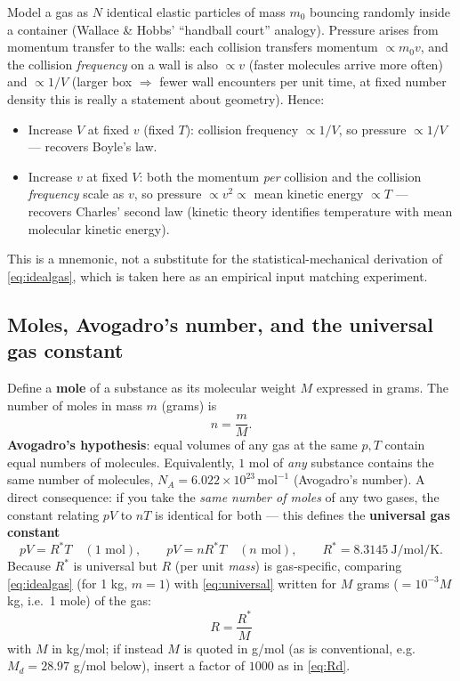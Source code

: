\documentclass[11pt]{article}
\begin{document}
\begin{intuition}
Model a gas as $N$ identical elastic particles of mass $m_0$ bouncing randomly inside a container (Wallace \& Hobbs' ``handball court'' analogy). Pressure arises from momentum transfer to the walls: each collision transfers momentum $\propto m_0 v$, and the collision \emph{frequency} on a wall is also $\propto v$ (faster molecules arrive more often) and $\propto 1/V$ (larger box $\Rightarrow$ fewer wall encounters per unit time, at fixed number density this is really a statement about geometry). Hence:
\begin{itemize}[leftmargin=1.4em]
\item Increase $V$ at fixed $v$ (fixed $T$): collision frequency $\propto 1/V$, so pressure $\propto 1/V$ — recovers Boyle's law.
\item Increase $v$ at fixed $V$: both the momentum \emph{per} collision and the collision \emph{frequency} scale as $v$, so pressure $\propto v^2 \propto$ mean kinetic energy $\propto T$ — recovers Charles' second law (kinetic theory identifies temperature with mean molecular kinetic energy).
\end{itemize}
This is a mnemonic, not a substitute for the statistical-mechanical derivation of \eqref{eq:idealgas}, which is taken here as an empirical input matching experiment.
\end{intuition}

\subsection{Moles, Avogadro's number, and the universal gas constant}

Define a \textbf{mole} of a substance as its molecular weight $M$ expressed in grams. The number of moles in mass $m$ (grams) is
\begin{equation}
n = \frac{m}{M}.
\end{equation}
\textbf{Avogadro's hypothesis}: equal volumes of any gas at the same $p,T$ contain equal numbers of molecules. Equivalently, $1$ mol of \emph{any} substance contains the same number of molecules, $N_A = 6.022\times10^{23}\,\text{mol}^{-1}$ (Avogadro's number). A direct consequence: if you take the \emph{same number of moles} of any two gases, the constant relating $pV$ to $nT$ is identical for both — this defines the \textbf{universal gas constant}
\begin{equation}
pV = R^{*}T \quad (\text{1 mol}), \qquad pV = nR^{*}T \quad (n \text{ mol}), \qquad R^{*}=8.3145\ \si{\joule\per\mol\per\kelvin}.
\label{eq:universal}
\end{equation}
Because $R^{*}$ is universal but $R$ (per unit \emph{mass}) is gas-specific, comparing \eqref{eq:idealgas} (for 1 kg, $m=1$) with \eqref{eq:universal} written for $M$ grams ($=10^{-3}M$ kg, i.e.\ 1 mole) of the gas:
\begin{equation}
\boxed{R = \frac{R^{*}}{M}}
\end{equation}
with $M$ in kg/mol; if instead $M$ is quoted in g/mol (as is conventional, e.g.\ $M_d=28.97$ g/mol below), insert a factor of $1000$ as in \eqref{eq:Rd}.
\end{document}
